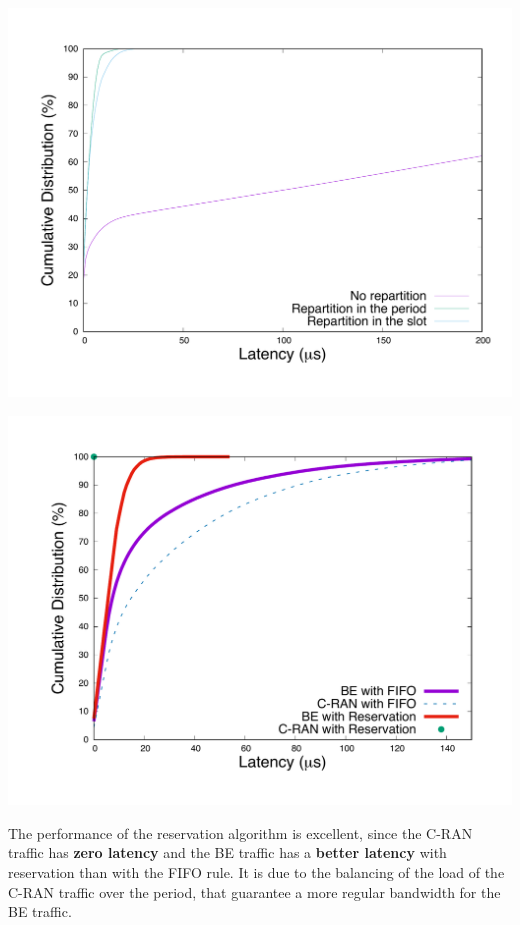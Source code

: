\documentclass[]{llncs}
\begin{document}
  \begin{minipage}[b]{0.45\linewidth}
\centering
      \includegraphics[scale=0.25]{repart1res}
        \label{fig:algocmp}
  \end{minipage} 
  \hfill
  \begin{minipage}[b]{0.45\linewidth}
\centering
      \includegraphics[scale=0.25]{optim.pdf}
        \label{fig:optimres}
  \end{minipage} 


  The performance of the reservation algorithm is excellent, since the C-RAN traffic has {\bf zero latency} and the BE traffic has a \textbf{better latency} with reservation than with the FIFO rule. It is due to the balancing of the load of the C-RAN traffic over the period, that guarantee a more regular bandwidth for the BE traffic.
  

  
  

\end{document}
